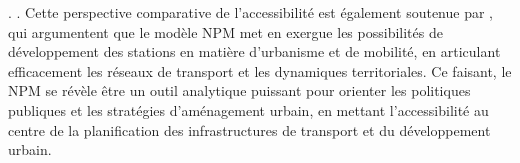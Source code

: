 \begin{refsegment}
{     \textcolor{blue}{\autocite[27]{dalvi_measurement_1976}}.
}. Cette perspective comparative de l'accessibilité est également soutenue par \textcolor{blue}{\textcite[521]{caset_measuring_2018}}, qui argumentent que le modèle \acrshort{NPM} met en exergue les possibilités de développement des stations en matière d'urbanisme et de mobilité, en articulant efficacement les réseaux de transport et les dynamiques territoriales. Ce faisant, le \acrshort{NPM} se révèle être un outil analytique puissant pour orienter les politiques publiques et les stratégies d'aménagement urbain, en mettant l'accessibilité au centre de la planification des infrastructures de transport et du développement urbain.%


\end{refsegment}
